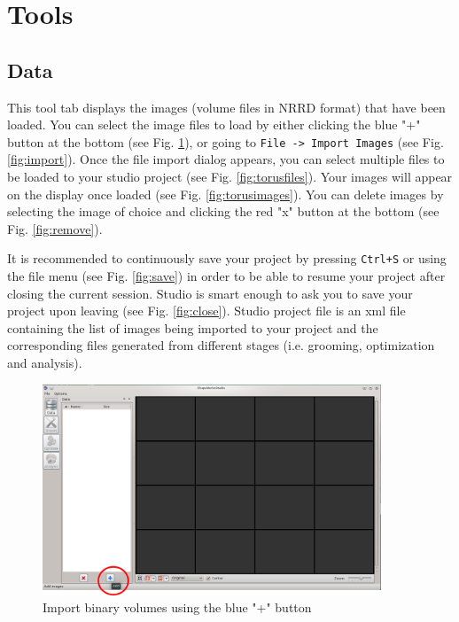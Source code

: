 \documentclass[letterpaper,12pt]{article}   %
\begin{document}
\section{Tools}

\subsection{Data}

This tool tab displays the images (volume files in NRRD format) that have been loaded. You can select the image files to load by either clicking the blue "+" button at the bottom (see Fig. \ref{fig:add}), or going to \texttt{File -> Import Images} (see Fig. \ref{fig:import}). Once the file import dialog appears, you can select multiple files to be loaded to your studio project (see Fig. \ref{fig:torusfiles}). Your images will appear on the display once loaded (see Fig. \ref{fig:torusimages}). You can delete images by selecting the image of choice and clicking the red "x" button at the bottom (see Fig. \ref{fig:remove}). 

It is recommended to continuously save your project by pressing \texttt{Ctrl+S} or using the file menu (see Fig. \ref{fig:save}) in order to be able to resume your project after closing the current session. Studio is smart enough to ask you to save your project upon leaving (see Fig. \ref{fig:close}). Studio project file is an xml file containing the list of images being imported to your project and the corresponding files generated from different stages (i.e. grooming, optimization and analysis).

\begin{figure}[!htp]
\centering
\includegraphics[width=0.9\textwidth]{figs/add.png}
\caption{Import binary volumes using the blue "+" button}
\label{fig:add}
\end{figure}
\end{document}
